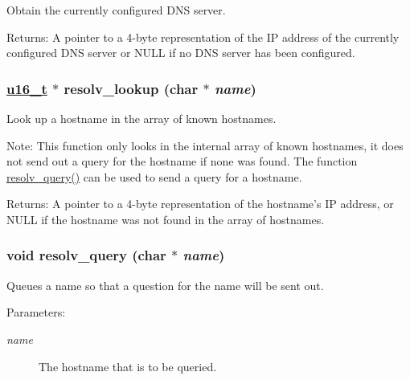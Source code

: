 Obtain the currently configured DNS server. 

\begin{Desc}
\item[Returns:]A pointer to a 4-byte representation of the IP address of the currently configured DNS server or NULL if no DNS server has been configured. \end{Desc}
\hypertarget{a00083_g66d19181ad5fe8b8f7c84d1f1d46a2ec}{
\subsubsection[resolv\_\-lookup]{\setlength{\rightskip}{0pt plus 5cm}\hyperlink{a00070_gfc6499c1f28697aa3bfc2804d496fd11}{u16\_\-t} $\ast$ resolv\_\-lookup (char $\ast$ {\em name})}}
\label{a00083_g66d19181ad5fe8b8f7c84d1f1d46a2ec}


Look up a hostname in the array of known hostnames. 

\begin{Desc}
\item[Note:]This function only looks in the internal array of known hostnames, it does not send out a query for the hostname if none was found. The function \hyperlink{a00083_ge4dcbbe6c641d2e3b8537b479df5fc99}{resolv\_\-query()} can be used to send a query for a hostname.\end{Desc}
\begin{Desc}
\item[Returns:]A pointer to a 4-byte representation of the hostname's IP address, or NULL if the hostname was not found in the array of hostnames. \end{Desc}
\hypertarget{a00083_ge4dcbbe6c641d2e3b8537b479df5fc99}{
\subsubsection[resolv\_\-query]{\setlength{\rightskip}{0pt plus 5cm}void resolv\_\-query (char $\ast$ {\em name})}}
\label{a00083_ge4dcbbe6c641d2e3b8537b479df5fc99}


Queues a name so that a question for the name will be sent out. 

\begin{Desc}
\item[Parameters:]
\begin{description}
\item[{\em name}]The hostname that is to be queried. \end{description}
\end{Desc}
